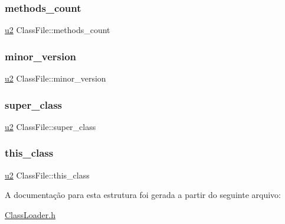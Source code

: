 \mbox{\label{structClassFile_aacfb45d4af64216324b1ae5269c870d5}} 
\subsubsection{\texorpdfstring{methods\+\_\+count}{methods\_count}}
{\footnotesize\ttfamily \hyperlink{ClassLoader_8h_a5f223212eef04d10a4550ded680cb1cf}{u2} Class\+File\+::methods\+\_\+count}

\mbox{\label{structClassFile_af0db7b0ea01cb9cea2cee177ca81df09}} 
\subsubsection{\texorpdfstring{minor\+\_\+version}{minor\_version}}
{\footnotesize\ttfamily \hyperlink{ClassLoader_8h_a5f223212eef04d10a4550ded680cb1cf}{u2} Class\+File\+::minor\+\_\+version}

\mbox{\label{structClassFile_a5f6c11c0ccb02fd992b5c102725253ec}} 
\subsubsection{\texorpdfstring{super\+\_\+class}{super\_class}}
{\footnotesize\ttfamily \hyperlink{ClassLoader_8h_a5f223212eef04d10a4550ded680cb1cf}{u2} Class\+File\+::super\+\_\+class}

\mbox{\label{structClassFile_a2d33db0a560a71b94bc572dd1e4ec03a}} 
\subsubsection{\texorpdfstring{this\+\_\+class}{this\_class}}
{\footnotesize\ttfamily \hyperlink{ClassLoader_8h_a5f223212eef04d10a4550ded680cb1cf}{u2} Class\+File\+::this\+\_\+class}



A documentação para esta estrutura foi gerada a partir do seguinte arquivo\+:\begin{DoxyCompactItemize}
\item 
\hyperlink{ClassLoader_8h}{Class\+Loader.\+h}\end{DoxyCompactItemize}
